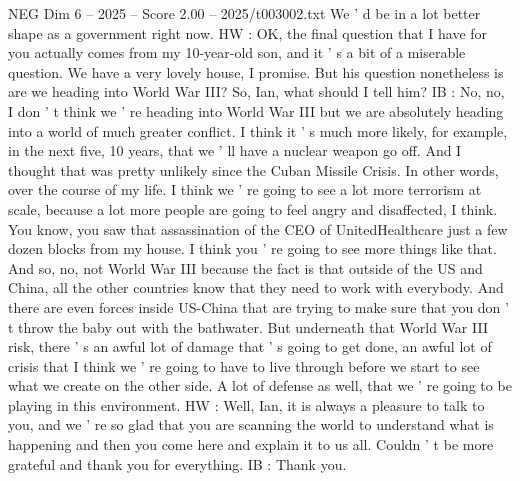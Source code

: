 \begin{textsample}{NEG Dim 6 – 2025 – Score 2.00 – 2025/t003002.txt}
We ' d be in a lot better shape as a government right now.
HW : OK, the final question that I have for you actually comes from my 10-year-old son, and it ' s a bit of a miserable question.
We have a very lovely house, I promise.
But his question nonetheless is are we heading into World War III?
So, Ian, what should I tell him?
IB : No, no, I don ' t think we ' re heading into World War III but we are absolutely heading into a world of much greater conflict.
I think it ' s much more likely, for example, in the next five, 10 years, that we ' ll have a nuclear weapon go off.
And I thought that was pretty unlikely since the Cuban Missile Crisis.
In other words, over the course of my life.
I think we ' re going to see a lot more terrorism at scale, because a lot more people are going to feel angry and disaffected, I think.
You know, you saw that assassination of the CEO of UnitedHealthcare just a few dozen blocks from my house.
I think you ' re going to see more things like that.
And so, no, not World War III because the fact is that outside of the US and China, all the other countries know that they need to work with everybody.
And there are even forces inside US-China that are trying to make sure that you don ' t throw the baby out with the bathwater.
But underneath that World War III risk, there ' s an awful lot of damage that ' s going to get done, an awful lot of crisis that I think we ' re going to have to live through before we start to see what we create on the other side.
A lot of defense as well, that we ' re going to be playing in this environment.
HW : Well, Ian, it is always a pleasure to talk to you, and we ' re so glad that you are scanning the world to understand what is happening and then you come here and explain it to us all.
Couldn ' t be more grateful and thank you for everything.
IB : Thank you.

\end{textsample}
